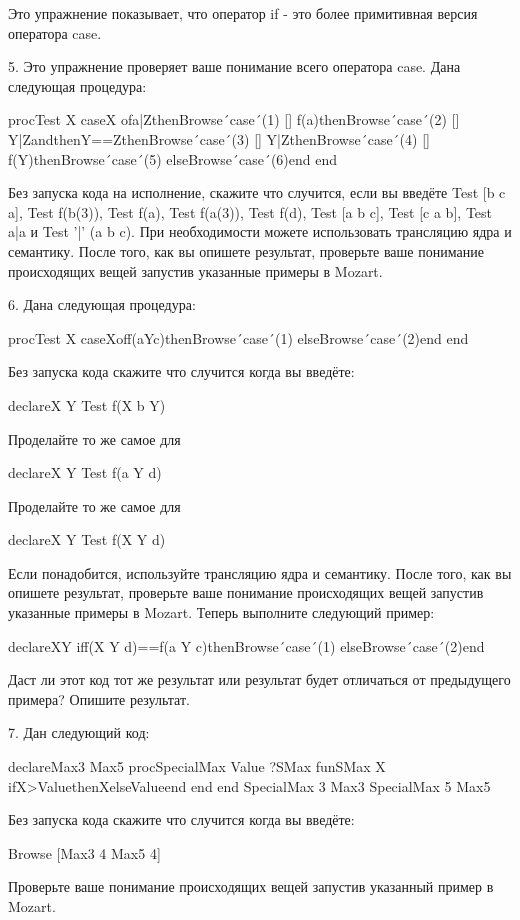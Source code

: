 Это упражнение показывает, что оператор if - это более примитивная версия оператора case.

5. Это упражнение проверяет ваше понимание всего оператора case. Дана следующая процедура:

proc{Test X}
caseX
ofa|Zthen{Browse´case´(1)}
[] f(a)then{Browse´case´(2)}
[] Y|ZandthenY==Zthen{Browse´case´(3)}
[] Y|Zthen{Browse´case´(4)}
[] f(Y)then{Browse´case´(5)}
else{Browse´case´(6)}end
end

Без запуска кода на исполнение, скажите что случится, если вы введёте {Test [b c a]}, {Test f(b(3))}, {Test f(a)}, {Test f(a(3))}, {Test f(d)}, {Test [a b c]}, {Test [c a b]}, {Test a|a} и {Test '|' (a b c)}. При необходимости можете использовать трансляцию ядра и семантику. После того, как вы опишете результат, проверьте ваше понимание происходящих вещей запустив указанные примеры в Mozart.

6. Дана следующая процедура:

proc{Test X}
caseXoff(aYc)then{Browse´case´(1)}
else{Browse´case´(2)}end
end

Без запуска кода скажите что случится когда вы введёте:

declareX Y {Test f(X b Y)}

Проделайте то же самое для

declareX Y {Test f(a Y d)}

Проделайте то же самое для

declareX Y {Test f(X Y d)}

Если понадобится, используйте трансляцию ядра и семантику. После того, как вы опишете результат, проверьте ваше понимание происходящих вещей запустив указанные примеры в Mozart. Теперь выполните следующий пример:

declareXY
iff(X Y d)==f(a Y c)then{Browse´case´(1)}
else{Browse´case´(2)}end

Даст ли этот код тот же результат или результат будет отличаться от предыдущего примера? Опишите результат.

7. Дан следующий код:

declareMax3 Max5
proc{SpecialMax Value ?SMax}
fun{SMax X}
ifX>ValuethenXelseValueend
end
end
{SpecialMax 3 Max3}
{SpecialMax 5 Max5}

Без запуска кода скажите что случится когда вы введёте:

{Browse [{Max3 4} {Max5 4}]}

Проверьте ваше понимание происходящих вещей запустив указанный пример в Mozart.

